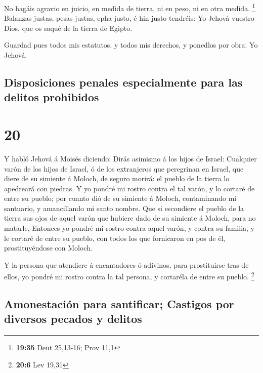  No hagáis agravio en juicio, en medida de tierra, ni en
peso, ni en otra medida. \footnote{\textbf{19:35} Deut 25,13-16; Prov
  11,1}  Balanzas justas, pesas justas, epha justo, é hin
justo tendréis: Yo Jehová vuestro Dios, que os saqué de la tierra de
Egipto.

 Guardad pues todos mis estatutos, y todos mis derechos, y
ponedlos por obra: Yo Jehová.

\hypertarget{disposiciones-penales-especialmente-para-las-delitos-prohibidos}{%
\subsection{Disposiciones penales especialmente para las delitos
prohibidos}\label{disposiciones-penales-especialmente-para-las-delitos-prohibidos}}

\hypertarget{section-19}{%
\section{20}\label{section-19}}

 Y habló Jehová á Moisés diciendo:  Dirás
asimismo á los hijos de Israel: Cualquier varón de los hijos de Israel,
ó de los extranjeros que peregrinan en Israel, que diere de su simiente
á Moloch, de seguro morirá: el pueblo de la tierra lo apedreará con
piedras.  Y yo pondré mi rostro contra el tal varón, y lo
cortaré de entre su pueblo; por cuanto dió de su simiente á Moloch,
contaminando mi santuario, y amancillando mi santo nombre. 
Que si escondiere el pueblo de la tierra sus ojos de aquel varón que
hubiere dado de su simiente á Moloch, para no matarle, 
Entonces yo pondré mi rostro contra aquel varón, y contra su familia, y
le cortaré de entre su pueblo, con todos los que fornicaron en pos de
él, prostituyéndose con Moloch.

 Y la persona que atendiere á encantadores ó adivinos, para
prostituirse tras de ellos, yo pondré mi rostro contra la tal persona, y
cortaréla de entre su pueblo. \footnote{\textbf{20:6} Lev 19,31}

\hypertarget{amonestaciuxf3n-para-santificar-castigos-por-diversos-pecados-y-delitos}{%
\subsection{Amonestación para santificar; Castigos por diversos pecados
y
delitos}\label{amonestaciuxf3n-para-santificar-castigos-por-diversos-pecados-y-delitos}}

